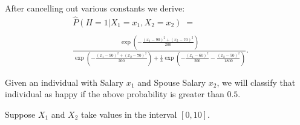\documentclass[12pt, answers]{exam}
\def\({\left(}
\def\){\right)}
\begin{document}
\begin{questions}
\begin{parts}
\begin{solution}
\bigskip

After cancelling out various constants we derive:
\begin{align*}
&\widehat{P}(H=1|X_1=x_1, X_2=x_2)\;=\\
\\
&\frac{\exp\left(-\frac{\(x_1-90\)^2+\(x_2-70\)^2}{200}\right)}
{\exp\left(-\frac{\(x_1-90\)^2+\(x_2-70\)^2}{200}\right)+
\frac{1}{3}\exp\left(-\frac{\(x_1-60\)^2}{200}-\frac{\(x_2-50\)^2}{1800}\right)}.
\end{align*}

Given an individual with Salary $x_1$ and Spouse Salary $x_2$, we will classify that individual as happy if the above probability is greater than $0.5$.

\end{solution}


\end{parts}

\clearpage


\question

Suppose $X_1$ and $X_2$ take values in the interval $[0,10]$.

\end{questions}
\end{document}
